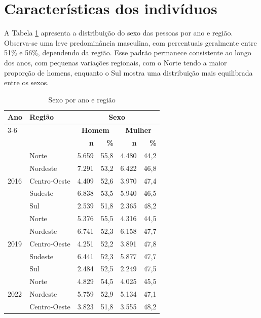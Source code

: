 \documentclass[12pt,a4paper,header]{abnt}
\begin{document}
\section{Características dos indivíduos}
A Tabela \ref{tab:sexo} apresenta a distribuição do sexo das pessoas por ano e região. Observa-se uma leve predominância masculina, com percentuais geralmente entre 51\% e 56\%, dependendo da região. Esse padrão permanece consistente ao longo dos anos, com pequenas variações regionais, com o Norte tendo a maior proporção de homens, enquanto o Sul mostra uma distribuição mais equilibrada entre os sexos.
\begin{table}[ht]
\centering
\caption{Sexo por ano e região}
\label{tab:sexo}
\begin{tabular}{llrrrr}
\toprule
\multirow{3}{*}{\textbf{Ano}} & \multirow{3}{*}{\textbf{Região}} & \multicolumn{4}{c}{\textbf{Sexo}} \\
\cmidrule(lr){3-6}
& & \multicolumn{2}{c}{\textbf{Homem}} & \multicolumn{2}{c}{\textbf{Mulher}} \\
& & \textbf{n} & \textbf{\%} & \textbf{n} & \textbf{\%} \\
\midrule
\multirow{5}{*}{2016} & Norte        & 5.659 & 55,8 & 4.480 & 44,2 \\
                      & Nordeste     & 7.291 & 53,2 & 6.422 & 46,8 \\
                      & Centro-Oeste & 4.409 & 52,6 & 3.970 & 47,4 \\
                      & Sudeste      & 6.838 & 53,5 & 5.940 & 46,5 \\
                      & Sul          & 2.539 & 51,8 & 2.365 & 48,2 \\
\midrule
\multirow{5}{*}{2019} & Norte        & 5.376 & 55,5 & 4.316 & 44,5 \\
                      & Nordeste     & 6.741 & 52,3 & 6.158 & 47,7 \\
                      & Centro-Oeste & 4.251 & 52,2 & 3.891 & 47,8 \\
                      & Sudeste      & 6.441 & 52,3 & 5.877 & 47,7 \\
                      & Sul          & 2.484 & 52,5 & 2.249 & 47,5 \\
\midrule
\multirow{5}{*}{2022} & Norte        & 4.829 & 54,5 & 4.025 & 45,5 \\
                      & Nordeste     & 5.759 & 52,9 & 5.134 & 47,1 \\
                      & Centro-Oeste & 3.823 & 51,8 & 3.555 & 48,2 \\

\end{tabular}
\end{table}
\end{document}
